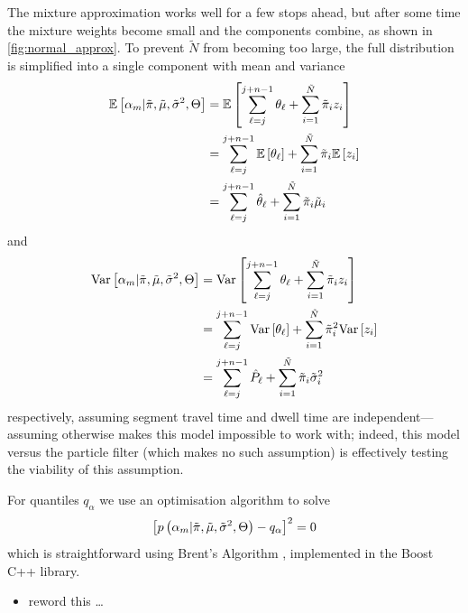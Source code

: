The mixture approximation works well for a few stops ahead, but after some time the mixture weights become small and the components combine, as shown in \cref{fig:normal_approx}. To prevent $\tilde N$ from becoming too large, the full distribution is simplified into a single component with mean and variance
\begin{equation}
\label{eq:mixture_mean}
\begin{split}
\mathbb{E}\left[\alpha_m | \tilde\pi, \tilde\mu, \tilde\sigma^2, \Theta\right] &=
\mathbb{E}\left[\sum_{\ell=j}^{j+n-1} \theta_\ell +
  \sum_{i=1}^{\tilde N} \tilde\pi_i z_i\right] \\
&= \sum_{\ell=j}^{j+n-1} \mathbb{E}\left[\theta_\ell\right] +
  \sum_{i=1}^{\tilde N} \tilde\pi_i \mathbb{E}\left[z_i\right] \\
&= \sum_{\ell=j}^{j+n-1} \hat{\theta}_\ell +
  \sum_{i=1}^{\tilde N} \tilde\pi_i \tilde\mu_i
\end{split}
\end{equation}
and
\begin{equation}
\label{eq:mixture_variance}
\begin{split}
\mathrm{Var}\left[\alpha_m | \tilde\pi, \tilde\mu, \tilde\sigma^2, \Theta\right] &=
\mathrm{Var}\left[\sum_{\ell=j}^{j+n-1} \theta_\ell +
  \sum_{i=1}^{\tilde N} \tilde\pi_i z_i\right] \\
&= \sum_{\ell=j}^{j+n-1} \mathrm{Var}\left[\theta_\ell\right] +
  \sum_{i=1}^{\tilde N} \tilde\pi_i^2 \mathrm{Var}\left[z_i\right] \\
&= \sum_{\ell=j}^{j+n-1} \hat{P}_\ell +
  \sum_{i=1}^{\tilde N} \tilde\pi_i \tilde\sigma_i^2
\end{split}
\end{equation}
respectively, assuming segment travel time and dwell time are independent---assuming otherwise makes this model impossible to work with; indeed, this model versus the particle filter (which makes no such assumption) is effectively testing the viability of this assumption.


For quantiles $q_\alpha$ we use an optimisation algorithm to solve
\begin{equation}
\label{eq:mixture_quadratic}
\left[
  p\left(\alpha_m | \tilde\pi, \tilde\mu, \tilde\sigma^2, \Theta\right) - q_\alpha
\right]^2 = 0
\end{equation}
which is straightforward using Brent's Algorithm \citep{Brent_1971}, implemented in the Boost \textsf{C++} library.


\begin{itemize}
\item reword this \ldots
\end{itemize}

